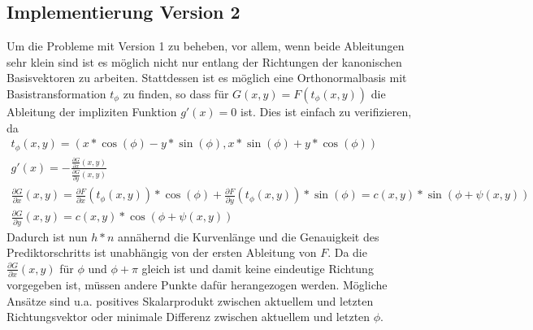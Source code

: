 \documentclass[a4paper,11pt,bibliography=totoc,listof=totoc,headinclude=true,cleardoublepage=empty,oneside]{scrartcl}
\newcommand{\diff}[2]{\frac{\partial #1}{\partial #2}}
\begin{document}
\subsection{Implementierung Version 2}
Um die Probleme mit Version 1 zu beheben, vor allem, wenn beide Ableitungen sehr klein sind ist es möglich nicht nur entlang der Richtungen der kanonischen Basisvektoren zu arbeiten. Stattdessen ist es möglich eine Orthonormalbasis mit Basistransformation $t_\phi$ zu finden, so dass für $G(x,y) = F(t_\phi(x,y))$ die Ableitung der impliziten Funktion $g'(x)=0$ ist.
Dies ist einfach zu verifizieren, da
\begin{align}
	t_\phi(x,y) = (x*\cos(\phi)-y*\sin(\phi), x*\sin(\phi)+y*\cos(\phi))\\
	g'(x) = -\frac{\diff{G}{x}(x,y)}{\diff{G}{y}(x,y)}\\
	\diff{G}{x}(x,y) = \diff{F}{x}(t_\phi(x,y))*\cos(\phi)+\diff{F}{y}(t_\phi(x,y))*\sin(\phi)=c(x,y)*\sin(\phi + \psi(x,y))\\
	\diff{G}{y}(x,y)=c(x,y)*\cos(\phi + \psi(x,y))
\end{align}
Dadurch ist nun $h*n$ annähernd die Kurvenlänge und die Genauigkeit des Prediktorschritts ist unabhängig von der ersten Ableitung von $F$.
Da die $\diff{G}{x}(x,y)$ für $\phi$ und $\phi+\pi$ gleich ist und damit keine eindeutige Richtung vorgegeben ist, müssen andere Punkte dafür herangezogen werden. Mögliche Ansätze sind u.a. positives Skalarprodukt zwischen aktuellem und letzten Richtungsvektor oder minimale Differenz zwischen aktuellem und letzten $\phi$.
\end{document}
